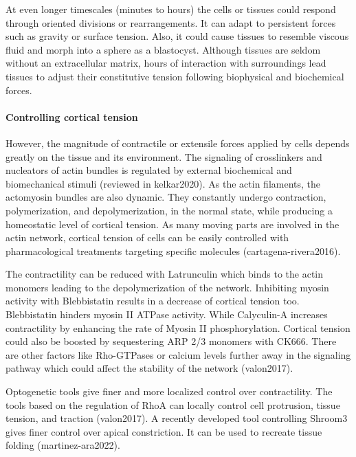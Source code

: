 \documentclass[
]{article}
\begin{document}
At even longer timescales (minutes to hours) the cells or tissues could
respond through oriented divisions or rearrangements. It can adapt to
persistent forces such as gravity or surface tension. Also, it could
cause tissues to resemble viscous fluid and morph into a sphere as a
blastocyst. Although tissues are seldom without an extracellular matrix,
hours of interaction with surroundings lead tissues to adjust their
constitutive tension following biophysical and biochemical forces.

\hypertarget{controlling-cortical-tension}{%
\paragraph{Controlling cortical
tension}\label{controlling-cortical-tension}}

However, the magnitude of contractile or extensile forces applied by
cells depends greatly on the tissue and its environment. The signaling
of crosslinkers and nucleators of actin bundles is regulated by external
biochemical and biomechanical stimuli (reviewed in kelkar2020). As the
actin filaments, the actomyosin bundles are also dynamic. They
constantly undergo contraction, polymerization, and depolymerization, in
the normal state, while producing a homeostatic level of cortical
tension. As many moving parts are involved in the actin network,
cortical tension of cells can be easily controlled with pharmacological
treatments targeting specific molecules (cartagena-rivera2016).

The contractility can be reduced with Latrunculin which binds to the
actin monomers leading to the depolymerization of the network.
Inhibiting myosin activity with Blebbistatin results in a decrease of
cortical tension too. Blebbistatin hinders myosin II ATPase activity.
While Calyculin-A increases contractility by enhancing the rate of
Myosin II phosphorylation. Cortical tension could also be boosted by
sequestering ARP 2/3 monomers with CK666. There are other factors like
Rho-GTPases or calcium levels further away in the signaling pathway
which could affect the stability of the network (valon2017).

Optogenetic tools give finer and more localized control over
contractility. The tools based on the regulation of RhoA can locally
control cell protrusion, tissue tension, and traction (valon2017). A
recently developed tool controlling Shroom3 gives finer control over
apical constriction. It can be used to recreate tissue folding
(martinez-ara2022).
\end{document}
